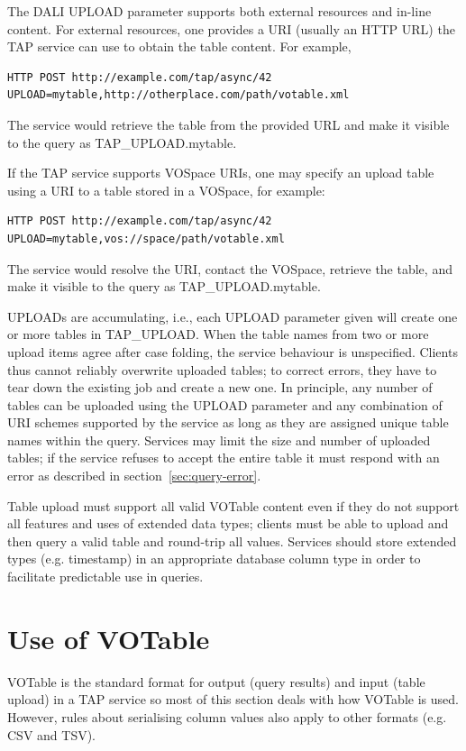 \documentclass[11pt,letter]{ivoa}
\newcommand{\tapupload}{TAP\_UPLOAD}
\newcommand{\tapupload}{%
  {\relsize{-0.5}TAP\discretionary{-}{}{\kern-2pt\_}UPLOAD}}
\begin{document}
The DALI UPLOAD parameter supports both external resources and 
in-line 
content. For external resources, one provides a URI (usually an HTTP URL) the 
TAP service can use to obtain the table content. For example,
\begin{verbatim}
HTTP POST http://example.com/tap/async/42
UPLOAD=mytable,http://otherplace.com/path/votable.xml
\end{verbatim}
The service would retrieve the table from the provided URL and 
make it visible to the query as \tapupload.mytable.

If the TAP service supports VOSpace URIs, one may 
specify an upload table using a URI to a table stored in a VOSpace, for example:
\begin{verbatim}
HTTP POST http://example.com/tap/async/42
UPLOAD=mytable,vos://space/path/votable.xml
\end{verbatim}
The service would resolve the URI, contact the VOSpace, retrieve the table, and 
make it visible to the query as \tapupload.mytable.

UPLOADs are accumulating, i.e., each UPLOAD parameter given will create one or 
more tables in \tapupload. When the table names from two or more 
upload items agree after case folding, the service behaviour is unspecified. 
Clients thus cannot reliably overwrite uploaded tables; to correct errors, they 
have to tear down the existing job and create a new one. In principle, any 
number of tables can be uploaded using the UPLOAD parameter and any combination 
of URI schemes supported by the service as long as they are assigned unique 
table names within the query. Services may limit the size and number of 
uploaded tables; if the service refuses to accept the entire table it must 
respond with an error as described in section~\ref{sec:query-error}.

Table upload must support all valid VOTable content even if they do not support 
all features and uses of extended data types; clients must be able to upload and then
query a valid table and round-trip all values. Services should store extended types (e.g. 
timestamp) in an appropriate database column type in order to facilitate predictable use 
in queries.

\section{Use of VOTable}
\label{sec:votable}

VOTable \citep{2013ivoa.spec.0920O} is the standard format for output (query 
results) and input (table upload) in a TAP service so most of this section 
deals with how VOTable is used. However, rules about serialising column values 
also apply to other formats (e.g. CSV and TSV).
\end{document}
